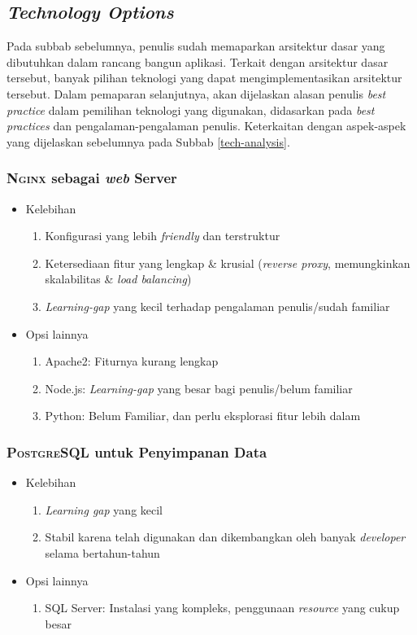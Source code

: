 
\subsection{\textit{Technology Options}}
\label{tech-options}

	Pada subbab sebelumnya, penulis sudah memaparkan arsitektur dasar yang dibutuhkan dalam rancang bangun aplikasi. Terkait dengan arsitektur dasar tersebut, banyak pilihan teknologi yang dapat mengimplementasikan arsitektur tersebut. Dalam pemaparan selanjutnya, akan dijelaskan alasan penulis \textit{best practice} dalam pemilihan teknologi yang digunakan, didasarkan pada \textit{best practices} dan pengalaman-pengalaman penulis. Keterkaitan dengan aspek-aspek yang dijelaskan sebelumnya pada Subbab \ref{tech-analysis}.
	
	\subsubsection{\textsc{Nginx} sebagai \textit{web} Server}
		\begin{itemize}
			\item Kelebihan
				\begin{enumerate}
					\item Konfigurasi yang lebih \textit{friendly} dan terstruktur
					\item Ketersediaan fitur yang lengkap \& krusial (\textit{reverse proxy}, memungkinkan skalabilitas \& \textit{load balancing})
					\item \textit{Learning-gap} yang kecil terhadap pengalaman penulis/sudah familiar
				\end{enumerate}
			\item Opsi lainnya
				\begin{enumerate}
					\item Apache2:  Fiturnya kurang lengkap
					\item Node.js:  \textit{Learning-gap} yang besar bagi penulis/belum familiar
					\item Python:  Belum Familiar, dan perlu eksplorasi fitur lebih dalam
				\end{enumerate}
		\end{itemize}
	
	\subsubsection{\textsc{PostgreSQL} untuk Penyimpanan Data}
	\begin{itemize}
		\item Kelebihan
		\begin{enumerate}
			\item \textit{Learning gap} yang kecil
			\item Stabil karena telah digunakan dan dikembangkan oleh banyak \textit{developer} selama bertahun-tahun
		\end{enumerate}
		\item Opsi lainnya
		\begin{enumerate}
			\item SQL Server:  Instalasi yang kompleks, penggunaan \textit{resource} yang cukup besar
		\end{enumerate}
	\end{itemize}
	
